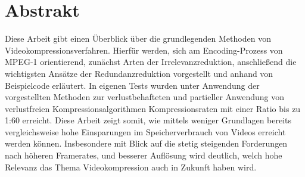 \chapter{Abstrakt}
Diese Arbeit gibt einen Überblick über die grundlegenden Methoden von Videokompressionsverfahren. Hierfür werden, sich am Encoding-Prozess von MPEG-1 orientierend, zunächst Arten der Irrelevanzreduktion, anschließend die wichtigsten Ansätze der Redundanzreduktion vorgestellt und anhand von Beispielcode erläutert. In eigenen Tests wurden unter Anwendung der vorgestellten Methoden zur verlustbehafteten und partieller Anwendung von verlustfreien Kompressionsalgorithmen Kompressionsraten mit einer Ratio bis zu 1:60 erreicht. Diese Arbeit zeigt somit, wie mittels weniger Grundlagen bereits vergleichsweise hohe Einsparungen im Speicherverbrauch von Videos erreicht werden können. Insbesondere mit Blick auf die stetig steigenden Forderungen nach höheren Framerates, und besserer Auflösung wird deutlich, welch hohe Relevanz das Thema Videokompression auch in Zukunft haben wird.
